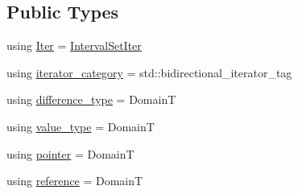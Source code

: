 \subsection*{Public Types}
\begin{DoxyCompactItemize}
\item 
using \hyperlink{structvt_1_1term_1_1interval_1_1_integral_set_base_1_1_interval_set_iter_a4056b2dcca9f60143d2d76387599e6e1}{Iter} = \hyperlink{structvt_1_1term_1_1interval_1_1_integral_set_base_1_1_interval_set_iter}{Interval\+Set\+Iter}
\item 
using \hyperlink{structvt_1_1term_1_1interval_1_1_integral_set_base_1_1_interval_set_iter_a50527fe18f4660916ae341f4d06b40d4}{iterator\+\_\+category} = std\+::bidirectional\+\_\+iterator\+\_\+tag
\item 
using \hyperlink{structvt_1_1term_1_1interval_1_1_integral_set_base_1_1_interval_set_iter_aba8b3805fbc28a4fbb78cad61e0f2ed4}{difference\+\_\+type} = DomainT
\item 
using \hyperlink{structvt_1_1term_1_1interval_1_1_integral_set_base_1_1_interval_set_iter_abc7b9a7a287957cc11f7f8679084fad8}{value\+\_\+type} = DomainT
\item 
using \hyperlink{structvt_1_1term_1_1interval_1_1_integral_set_base_1_1_interval_set_iter_a9da8b4820369a4e830f6ca596e08270c}{pointer} = DomainT
\item 
using \hyperlink{structvt_1_1term_1_1interval_1_1_integral_set_base_1_1_interval_set_iter_a59b5e1223198deaeacb85051517dd80a}{reference} = DomainT
\end{DoxyCompactItemize}

